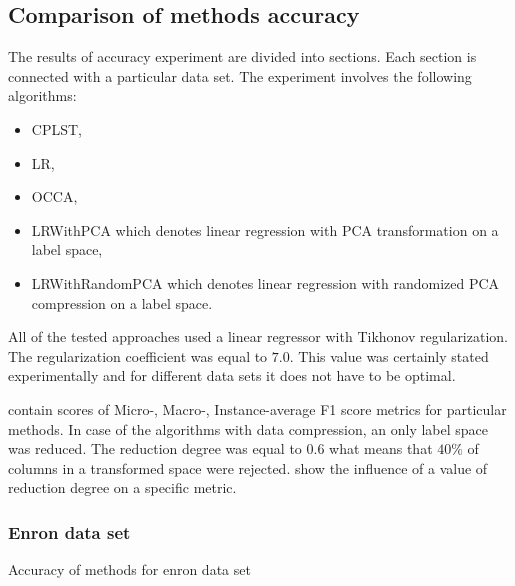\subsection{Comparison of methods accuracy}

The results of accuracy experiment are divided into sections. Each section is connected with a particular data set. The experiment involves the following algorithms:
\begin{itemize}
    \item CPLST,
    \item LR,
    \item OCCA,
    \item LRWithPCA which denotes linear regression with PCA transformation on a label space,
    \item LRWithRandomPCA which denotes linear regression with randomized PCA compression on a label space.
\end{itemize}
All of the tested approaches used a linear regressor with Tikhonov regularization. The regularization coefficient was equal to $7.0$. This value was certainly stated experimentally and for different data sets it does not have to be optimal.  

 contain scores of Micro-, Macro-, Instance-average F1 score metrics for particular methods. In case of the algorithms with data compression, an only label space was reduced. The reduction degree was equal to $0.6$ what means that $40\%$ of columns in a transformed space were rejected.
 show the influence of a value of reduction degree on a specific metric. 

\newpage
\subsubsection{Enron data set}

\begin{table}[H]
\centering
\caption{Accuracy of methods for enron data set}
\label{tab:exp1}
\end{table}

